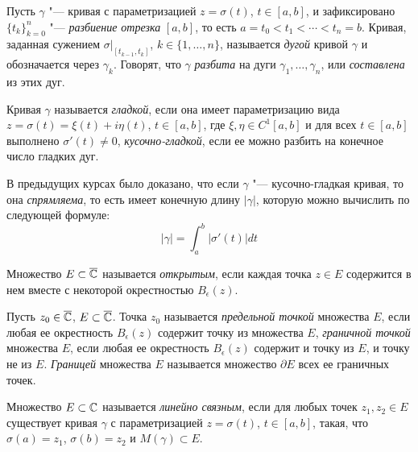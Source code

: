 \begin{definition}
	Пусть $\gamma$ "--- кривая с параметризацией $z = \sigma(t)$, $t \in [a, b]$, и зафиксировано $\{t_k\}_{k = 0}^n$ "--- \textit{разбиение отрезка} $[a, b]$, то есть $a = t_0 < t_1 < \dotsb < t_n = b$. Кривая, заданная сужением $\sigma|_{[t_{k-1}, t_k]}$, $k \in \{1, \dotsc, n\}$, называется \textit{дугой} кривой $\gamma$ и обозначается через $\gamma_k$. Говорят, что $\gamma$ \textit{разбита} на дуги $\gamma_1, \dotsc, \gamma_n$, или \textit{составлена} из этих дуг.
\end{definition}

\begin{definition}
	Кривая $\gamma$ называется \textit{гладкой}, если она имеет параметризацию вида $z = \sigma(t) = \xi(t) + i\eta(t)$, $t \in [a, b]$, где $\xi, \eta \in C^{1}[a, b]$ и для всех $t \in [a, b]$ выполнено $\sigma'(t) \ne 0$, \textit{кусочно-гладкой}, если ее можно разбить на конечное число гладких дуг.
\end{definition}

\begin{note}
	В предыдущих курсах было доказано, что если $\gamma$ "--- кусочно-гладкая кривая, то она \textit{спрямляема}, то есть имеет конечную длину $|\gamma|$, которую можно вычислить по следующей формуле:
	\[|\gamma| = \int_a^b|\sigma'(t)|dt\]
\end{note}

\begin{note}
	Множество $E \subset \overline{\mathbb{C}}$ называется \textit{открытым}, если каждая точка $z \in E$ содержится в нем вместе с некоторой окрестностью $B_\epsilon(z)$.
\end{note}

\begin{definition}
	Пусть $z_0 \in \overline{\mathbb{C}}$, $E \subset \overline{\mathbb{C}}$. Точка $z_0$ называется \textit{предельной точкой} множества $E$, если любая ее окрестность $B_\epsilon(z)$ содержит точку из множества $E$, \textit{граничной точкой} множества $E$, если любая ее окрестность $B_\epsilon(z)$ содержит и точку из $E$, и точку не из $E$. \textit{Границей} множества $E$ называется множество $\partial E$ всех ее граничных точек.
\end{definition}

\begin{definition}
	Множество $E \subset \mathbb{C}$ называется \textit{линейно связным}, если для любых точек $z_1, z_2 \in E$ существует кривая $\gamma$ с параметризацией $z = \sigma(t)$, $t \in [a, b]$, такая, что $\sigma(a) = z_1$, $\sigma(b) = z_2$ и $M(\gamma) \subset E$.
\end{definition}

